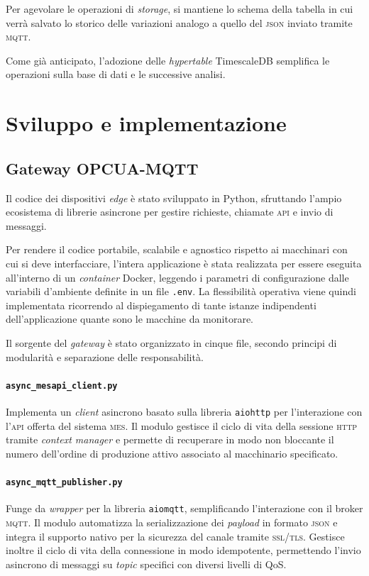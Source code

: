 \documentclass[12pt]{article}
\begin{document}
    Per agevolare le operazioni di \textit{storage}, si mantiene lo schema della tabella in cui verrà salvato lo storico delle variazioni analogo a quello del \textsc{json} inviato tramite \textsc{mqtt}.

    Come già anticipato, l'adozione delle \textit{hypertable} TimescaleDB semplifica le operazioni sulla base di dati e le successive analisi.
    
    
    \section{Sviluppo e implementazione}
    \subsection{Gateway OPCUA-MQTT}
    Il codice dei dispositivi \textit{edge} è stato sviluppato in Python, sfruttando l'ampio ecosistema di librerie asincrone per gestire richieste, chiamate \textsc{api} e invio di messaggi. 
    
    Per rendere il codice portabile, scalabile e agnostico rispetto ai macchinari con cui si deve interfacciare, l'intera applicazione è stata realizzata per essere eseguita all'interno di un \textit{container} Docker, leggendo i parametri di configurazione dalle variabili d'ambiente definite in un file \verb|.env|. La flessibilità operativa viene quindi implementata ricorrendo al dispiegamento di tante istanze indipendenti dell'applicazione quante sono le macchine da monitorare.

    Il sorgente del \textit{gateway} è stato organizzato in cinque file, secondo principi di modularità e separazione delle responsabilità.

    \paragraph{\texttt{async\_mesapi\_client.py}} Implementa un \textit{client} asincrono basato sulla libreria \verb|aiohttp| per l'interazione con l'\textsc{api} offerta del sistema \textsc{mes}. Il modulo gestisce il ciclo di vita della sessione \textsc{http} tramite \textit{context manager} e permette di recuperare in modo non bloccante il numero dell'ordine di produzione attivo associato al macchinario specificato.

    \paragraph{\texttt{async\_mqtt\_publisher.py}} Funge da \textit{wrapper} per la libreria \verb|aiomqtt|, semplificando l'interazione con il broker \textsc{mqtt}. Il modulo automatizza la serializzazione dei \textit{payload} in formato \textsc{json} e integra il supporto nativo per la sicurezza del canale tramite \textsc{ssl}/\textsc{tls}. Gestisce inoltre il ciclo di vita della connessione in modo idempotente, permettendo l'invio asincrono di messaggi su \textit{topic} specifici con diversi livelli di QoS.
\end{document}
